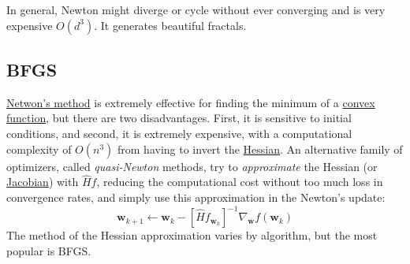 	In general, Newton might diverge or cycle without ever converging and is very expensive $O(d^3)$. It generates beautiful fractals.

\subsection{BFGS}

  \hyperref[def:netwons-method]{Netwon's method} is extremely effective for finding the minimum of a \hyperref[mt-def:convex-function]{convex function}, but there are two disadvantages. First, it is sensitive to initial conditions, and second, it is extremely expensive, with a computational complexity of $O(n^3)$ from having to invert the \hyperref[mv-def:hessian]{Hessian}. An alternative family of optimizers, called \textit{quasi-Newton} methods, try to \textit{approximate} the Hessian (or \hyperref[mv-def:jacobian]{Jacobian}) with $\hat{H} f$, reducing the computational cost without too much loss in convergence rates, and simply use this approximation in the Newton's update: 
  \begin{equation}
    \mathbf{w}_{k+1} \gets \mathbf{w}_k - [\hat{H} f_{\mathbf{w}_k}]^{-1} \nabla_\mathbf{w} f (\mathbf{w}_k)
  \end{equation}
  The method of the Hessian approximation varies by algorithm, but the most popular is BFGS. 

